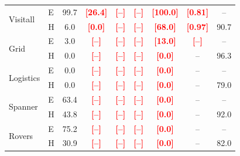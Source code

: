 \documentclass[letterpaper]{article} %
\newcommand{\todonum}[1]{\textcolor{red}{\textbf{[#1]}}}
\begin{document}
\begin{table}[t]
\begin{tabular}{@{}ll|cc|ccc|c|c@{}}
\midrule
\multirow{2}{*}{Visitall}  & E & 99.7 & \todonum{26.4} & \todonum{--} & \todonum{--} & \todonum{100.0} & \todonum{0.81} & -- \\
                           & H & 6.0  & \todonum{0.0} & \todonum{--} & \todonum{--} & \todonum{\textbf{68.0}} & \todonum{0.97} & 90.7 \\
\midrule
\multirow{2}{*}{Grid}      & E & 3.0  & \todonum{--} & \todonum{--} & \todonum{--} & \todonum{13.0} & \todonum{--} & -- \\
                           & H & 0.0  & \todonum{--} & \todonum{--} & \todonum{--} & \todonum{0.0}  & -- & 96.3 \\
\midrule
\multirow{2}{*}{Logistics} & E & 0.0  & \todonum{--} & \todonum{--} & \todonum{--} & \todonum{0.0}  & -- & -- \\
                           & H & 0.0  & \todonum{--} & \todonum{--} & \todonum{--} & \todonum{0.0}  & -- & 79.0 \\
\midrule
\multirow{2}{*}{Spanner}   & E & 63.4 & \todonum{--} & \todonum{--} & \todonum{--} & \todonum{0.0}  & -- & -- \\
                           & H & 43.8 & \todonum{--} & \todonum{--} & \todonum{--} & \todonum{0.0}  & -- & 92.0 \\
\midrule
\multirow{2}{*}{Rovers}    & E & 75.2 & \todonum{--} & \todonum{--} & \todonum{--} & \todonum{0.0}  & -- & -- \\
                           & H & 30.9 & \todonum{--} & \todonum{--} & \todonum{--} & \todonum{0.0}  & -- & 82.0 \\
\bottomrule
\end{tabular}
\end{table}
\end{document}
